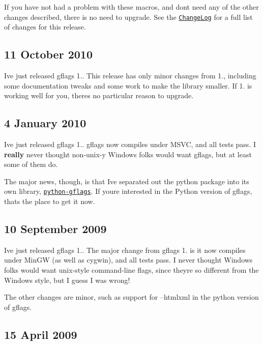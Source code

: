 If you have not had a problem with these macros, and don\textquotesingle{}t need any of the other changes described, there is no need to upgrade. See the \href{ChangeLog.txt}{\tt Change\+Log} for a full list of changes for this release.

\subsection*{11 October 2010 }

I\textquotesingle{}ve just released gflags 1.. This release has only minor changes from 1., including some documentation tweaks and some work to make the library smaller. If 1. is working well for you, there\textquotesingle{}s no particular reason to upgrade.

\subsection*{4 January 2010 }

I\textquotesingle{}ve just released gflags 1.. gflags now compiles under M\+S\+VC, and all tests pass. I {\bfseries really} never thought non-\/unix-\/y Windows folks would want gflags, but at least some of them do.

The major news, though, is that I\textquotesingle{}ve separated out the python package into its own library, \href{http://code.google.com/p/python-gflags}{\tt python-\/gflags}. If you\textquotesingle{}re interested in the Python version of gflags, that\textquotesingle{}s the place to get it now.

\subsection*{10 September 2009 }

I\textquotesingle{}ve just released gflags 1.. The major change from gflags 1. is it now compiles under Min\+GW (as well as cygwin), and all tests pass. I never thought Windows folks would want unix-\/style command-\/line flags, since they\textquotesingle{}re so different from the Windows style, but I guess I was wrong!

The other changes are minor, such as support for --htmlxml in the python version of gflags.

\subsection*{15 April 2009 }


